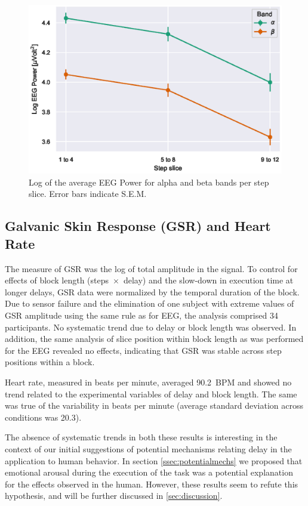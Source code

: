 \begin{figure}[h]
    \centering
    \includegraphics[width=.8\textwidth]{publications/2021ImpactDelayedResponse/Fig11.eps}
    \caption{Log of the average EEG Power for alpha and beta bands per step slice. Error bars indicate S.E.M.}\label{fig:logeegpow:slices}
\end{figure}

\subsection{Galvanic Skin Response (GSR) and Heart Rate}
The measure of GSR was the log of total amplitude in the signal.
To control for effects of block length (steps~\( \times \)~delay) and the slow-down in execution time at longer delays, GSR data were normalized by the temporal duration of the block.
Due to sensor failure and the elimination of one subject with extreme values of GSR amplitude using the same rule as for EEG, the analysis comprised 34 participants.
No systematic trend due to delay or block length was observed.
In addition, the same analysis of slice position within block length as was performed for the EEG revealed no effects, indicating that GSR was stable across step positions within a block. 

Heart rate, measured in beats per minute, averaged \num{90.2}~BPM and showed no trend related to the experimental variables of delay and block length.
The same was true of the variability in beats per minute (average standard deviation across conditions was \num{20.3}).

The absence of systematic trends in both these results is interesting in the context of our initial suggestions of potential mechanisms relating delay in the application to human behavior.
In section \cref{ssec:potentialmechs} we proposed that emotional arousal during the execution of the task was a potential explanation for the effects observed in the human.
However, these results seem to refute this hypothesis, and will be further discussed in \cref{sec:discussion}.

